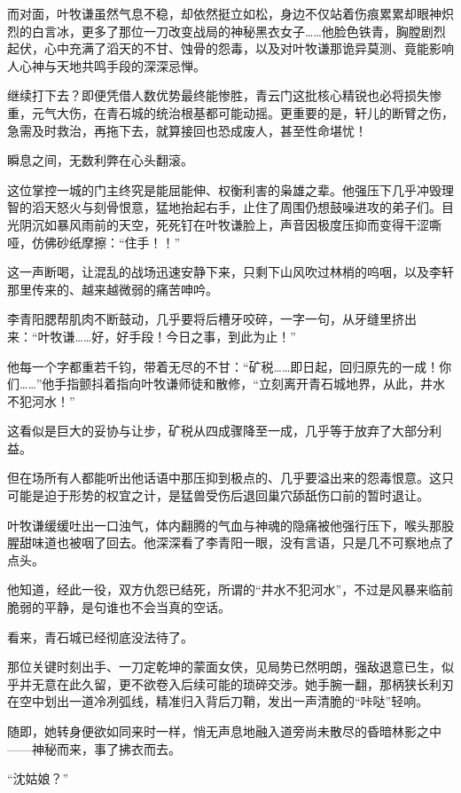 而对面，叶牧谦虽然气息不稳，却依然挺立如松，身边不仅站着伤痕累累却眼神炽烈的白言冰，更多了那位一刀改变战局的神秘黑衣女子……他脸色铁青，胸膛剧烈起伏，心中充满了滔天的不甘、蚀骨的怨毒，以及对叶牧谦那诡异莫测、竟能影响人心神与天地共鸣手段的深深忌惮。

继续打下去？即便凭借人数优势最终能惨胜，青云门这批核心精锐也必将损失惨重，元气大伤，在青石城的统治根基都可能动摇。更重要的是，轩儿的断臂之伤，急需及时救治，再拖下去，就算接回也恐成废人，甚至性命堪忧！

瞬息之间，无数利弊在心头翻滚。

这位掌控一城的门主终究是能屈能伸、权衡利害的枭雄之辈。他强压下几乎冲毁理智的滔天怒火与刻骨恨意，猛地抬起右手，止住了周围仍想鼓噪进攻的弟子们。目光阴沉如暴风雨前的天空，死死钉在叶牧谦脸上，声音因极度压抑而变得干涩嘶哑，仿佛砂纸摩擦：“住手！！”

这一声断喝，让混乱的战场迅速安静下来，只剩下山风吹过林梢的呜咽，以及李轩那里传来的、越来越微弱的痛苦呻吟。

李青阳腮帮肌肉不断鼓动，几乎要将后槽牙咬碎，一字一句，从牙缝里挤出来：“叶牧谦……好，好手段！今日之事，到此为止！”

他每一个字都重若千钧，带着无尽的不甘：“矿税……即日起，回归原先的一成！你们……”他手指颤抖着指向叶牧谦师徒和散修，“立刻离开青石城地界，从此，井水不犯河水！”

这看似是巨大的妥协与让步，矿税从四成骤降至一成，几乎等于放弃了大部分利益。

但在场所有人都能听出他话语中那压抑到极点的、几乎要溢出来的怨毒恨意。这只可能是迫于形势的权宜之计，是猛兽受伤后退回巢穴舔舐伤口前的暂时退让。

叶牧谦缓缓吐出一口浊气，体内翻腾的气血与神魂的隐痛被他强行压下，喉头那股腥甜味道也被咽了回去。他深深看了李青阳一眼，没有言语，只是几不可察地点了点头。

他知道，经此一役，双方仇怨已结死，所谓的“井水不犯河水”，不过是风暴来临前脆弱的平静，是句谁也不会当真的空话。

看来，青石城已经彻底没法待了。

\vspace{2em}

那位关键时刻出手、一刀定乾坤的蒙面女侠，见局势已然明朗，强敌退意已生，似乎并无意在此久留，更不欲卷入后续可能的琐碎交涉。她手腕一翻，那柄狭长利刃在空中划出一道冷冽弧线，精准归入背后刀鞘，发出一声清脆的“咔哒”轻响。

随即，她转身便欲如同来时一样，悄无声息地融入道旁尚未散尽的昏暗林影之中——神秘而来，事了拂衣而去。

“沈姑娘？”

